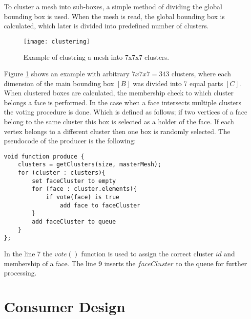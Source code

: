 To cluster a mesh into sub-boxes, a simple method of dividing the global bounding box is used. When the mesh is read, the global bounding box is calculated, which later is divided into predefined number of clusters.

\begin{figure}[H]
  \begin{center}
    \texttt{[image: clustering]}
    \caption{Example of clustring a mesh into 7x7x7 clusters.}
    \label{fig:clustering}
  \end{center}
\end{figure}

Figure \ref{fig:clustering} shows an example with arbitrary $7x7x7=343$ clusters, where each dimension of the main bounding box $[B]$ was divided into 7 equal parts $[C]$. When clustered boxes are calculated, the membership check to which cluster belongs a face is performed. In the case when a face intersects multiple clusters the voting procedure is done. Which is defined as follows; if two vertices of a face belong to the same cluster this box is selected as a holder of the face. If each vertex belongs to a different cluster then one box is randomly selected. The pseudocode of the producer is the following:
\newline
\begin{center}
\begin{lstlisting}[caption={C style psuedocode of a producer.},captionpos=b]
void function produce {
    clusters = getClusters(size, masterMesh);
    for (cluster : clusters){
        set faceCluster to empty
        for (face : cluster.elements){
            if vote(face) is true
                add face to faceCluster
        }
        add faceCluster to queue
    }
};
\end{lstlisting}
\end{center}

In the line 7 the $vote()$ function is used to assign the correct cluster $id$ and membership of a face. The line 9 inserts the $faceCluster$ to the queue for further processing.

\newpage
\section{Consumer Design}


